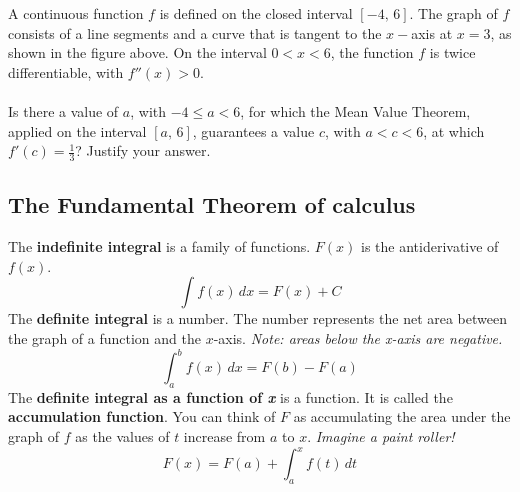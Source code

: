 \documentclass[addpoints, 12pt]{exam}
\begin{document}
\newpage


\begin{center}
\end{center}

\begin{questions}
    \setcounter{question}{2}
    \question A continuous function $f$ is defined on the closed interval $[-4,\,6]$. The graph of $f$ consists of a line segments and a curve that is tangent to the $x-$axis at $x=3$, as shown in the figure above. On the interval $0<x<6$, the function $f$ is twice differentiable, with $f''(x)>0$.\\
    \\
    Is there a value of $a$, with $-4\le a<6$, for which the Mean Value Theorem, applied on the interval $[a,\,6]$, guarantees a value $c$, with $a<c<6$, at which $f'(c)=\frac{1}{3}$? Justify your answer.
\end{questions}


\newpage
{}
\subsection*{The Fundamental Theorem of calculus}
The \textbf{indefinite integral} is a family of functions. $F(x)$ is the antiderivative of $f(x)$.
\[\int f(x)\,dx=F(x)+C\]
The \textbf{definite integral} is a number. The number represents the net area between the graph of a function and the $x$-axis. \textit{Note: areas below the x-axis are negative.}
\[\int_a^b f(x)\,dx=F(b)-F(a)\]
The \textbf{definite integral as a function of \textit{x}} is a function. It is called the \textbf{accumulation function}. You can think of $F$ as accumulating the area under the graph of $f$ as the values of $t$ increase from $a$ to $x$. \textit{Imagine a paint roller!}
\[F(x)=F(a)+\int_a^x f(t)\,dt\]
\end{document}
